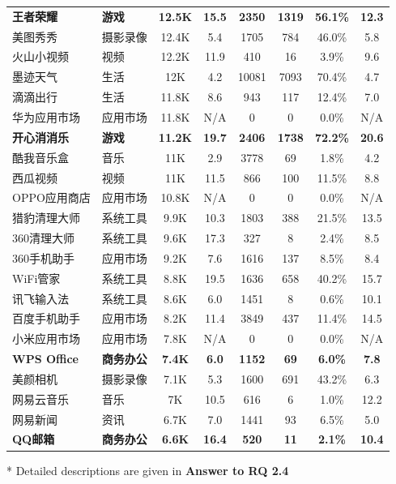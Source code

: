 \begin{ThreePartTable}
\begin{longtable}{l l c c c c c c}
\rowcolor{gray!15} {\bf 王者荣耀}\tnote{*} & {\bf 游戏} & {\bf 12.5K} & {\bf 15.5} & {\bf 2350} & {\bf 1319} & {\bf 56.1\%} & {\bf 12.3} \\
美图秀秀 & 摄影录像 & 12.4K & 5.4 & 1705 & 784 & 46.0\% & 5.8 \\
\rowcolor{gray!15} 火山小视频 & 视频 & 12.2K & 11.9 & 410 & 16 & 3.9\% & 9.6 \\
墨迹天气 & 生活 & 12K & 4.2 & 10081 & 7093 & 70.4\% & 4.7 \\
\rowcolor{gray!15} 滴滴出行 & 生活 & 11.8K & 8.6 & 943 & 117 & 12.4\% & 7.0 \\
华为应用市场 & 应用市场 & 11.8K & N/A & 0 & 0 & 0.0\% & N/A\\
\rowcolor{gray!15} {\bf 开心消消乐}\tnote{*} & {\bf 游戏} & {\bf 11.2K} & {\bf 19.7} & {\bf 2406} & {\bf 1738} & {\bf 72.2\%} & {\bf 20.6} \\
酷我音乐盒 & 音乐 & 11K & 2.9 & 3778 & 69 & 1.8\% & 4.2 \\
\rowcolor{gray!15} 西瓜视频 & 视频 & 11K & 11.5 & 866 & 100 & 11.5\% & 8.8 \\
OPPO应用商店 & 应用市场 & 10.8K & N/A & 0 & 0 & 0.0\% & N/A\\
\rowcolor{gray!15} 猎豹清理大师 & 系统工具 & 9.9K & 10.3 & 1803 & 388 & 21.5\% & 13.5 \\
360清理大师 & 系统工具 & 9.6K & 17.3 & 327 & 8 & 2.4\% & 8.5 \\
\rowcolor{gray!15} 360手机助手 & 应用市场 & 9.2K & 7.6 & 1616 & 137 & 8.5\% & 8.4 \\
WiFi管家 & 系统工具 & 8.8K & 19.5 & 1636 & 658 & 40.2\% & 15.7 \\
\rowcolor{gray!15} 讯飞输入法 & 系统工具 & 8.6K & 6.0 & 1451 & 8 & 0.6\% & 10.1 \\
百度手机助手 & 应用市场 & 8.2K & 11.4 & 3849 & 437 & 11.4\% & 14.5 \\
\rowcolor{gray!15} 小米应用市场 & 应用市场 & 7.8K & N/A & 0 & 0 & 0.0\% & N/A\\
{\bf WPS Office}\tnote{*} & {\bf 商务办公} & {\bf 7.4K} & {\bf 6.0} & {\bf 1152} & {\bf 69} & {\bf 6.0\%} & {\bf 7.8} \\
\rowcolor{gray!15} 美颜相机 & 摄影录像 & 7.1K & 5.3 & 1600 & 691 & 43.2\% & 6.3 \\
网易云音乐 & 音乐 & 7K & 10.5 & 616 & 6 & 1.0\% & 12.2 \\
\rowcolor{gray!15} 网易新闻 & 资讯 & 6.7K & 7.0 & 1441 & 93 & 6.5\% & 5.0 \\
{\bf QQ邮箱}\tnote{*} & {\bf 商务办公} & {\bf 6.6K} & {\bf 16.4} & {\bf 520} & {\bf 11} & {\bf 2.1\%} & {\bf 10.4} \\
\bottomrule
\end{longtable}
\begin{tablenotes}
  \footnotesize
  \item[*] Detailed descriptions are given in {\bf Answer to RQ 2.4}
\end{tablenotes}
\vspace{-3mm}
\end{ThreePartTable}


